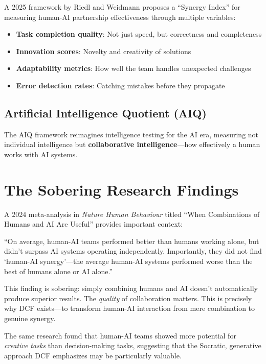 A 2025 framework by Riedl and Weidmann \cite{riedl2025synergy} proposes a ``Synergy Index'' for measuring human-AI partnership effectiveness through multiple variables:

\begin{itemize}
    \item \textbf{Task completion quality}: Not just speed, but correctness and completeness
    \item \textbf{Innovation scores}: Novelty and creativity of solutions
    \item \textbf{Adaptability metrics}: How well the team handles unexpected challenges
    \item \textbf{Error detection rates}: Catching mistakes before they propagate
\end{itemize}

\subsection{Artificial Intelligence Quotient (AIQ)}

The AIQ framework reimagines intelligence testing for the AI era, measuring not individual intelligence but \textbf{collaborative intelligence}---how effectively a human works with AI systems.

\section{The Sobering Research Findings}

A 2024 meta-analysis in \emph{Nature Human Behaviour} \cite{naturehb2024combinations} titled ``When Combinations of Humans and AI Are Useful'' provides important context:

\begin{quotebox}
``On average, human-AI teams performed better than humans working alone, but didn't surpass AI systems operating independently. Importantly, they did not find `human-AI synergy'---the average human-AI systems performed worse than the best of humans alone or AI alone.''
\end{quotebox}

This finding is sobering: simply combining humans and AI doesn't automatically produce superior results. The \emph{quality} of collaboration matters. This is precisely why DCF exists---to transform human-AI interaction from mere combination to genuine synergy.

The same research found that human-AI teams showed more potential for \emph{creative tasks} than decision-making tasks, suggesting that the Socratic, generative approach DCF emphasizes may be particularly valuable.

